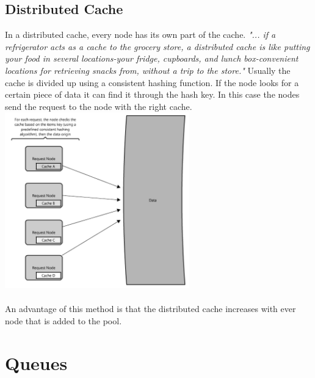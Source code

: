 \documentclass[12p]{article}
\begin{document}
	\subsection{Distributed Cache}
	In a distributed cache, every node has its own part of the cache. \textit{"... if a refrigerator acts as a cache to the grocery store, a distributed cache is like putting your food in several locations-your fridge, cupboards, and lunch box-convenient locations for retrieving snacks from, without a trip to the store."}\cite{cache} Usually the cache is divided up using a consistent hashing function. If the node looks for a certain piece of data it can find it through the hash key. In this case the nodes send the request to the node with the right cache.
	 \includegraphics[width=0.6\textwidth]{img/distrib} \cite{cache} \\\\
	An advantage of this method is that the distributed cache increases with ever node that is added to the pool.
	
	\newpage
	\section{Queues}
	
\end{document}
